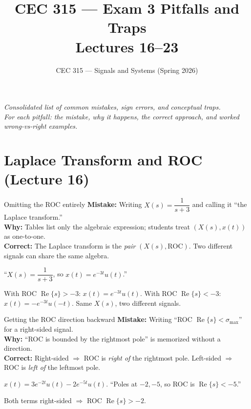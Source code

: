 \documentclass[11pt]{article}
\title{CEC 315 --- Exam 3 Pitfalls and Traps\\\large Lectures 16--23}
\author{CEC 315 --- Signals and Systems (Spring 2026)}
\date{}
\renewcommand{\Re}{\operatorname{Re}}
\begin{document}
\maketitle

\begin{center}
\emph{Consolidated list of common mistakes, sign errors, and conceptual traps.\\
For each pitfall: the mistake, why it happens, the correct approach, and worked wrong-vs-right examples.}
\end{center}

\tableofcontents
\newpage

\section{Laplace Transform and ROC (Lecture 16)}

\begin{pitfallbox}{Omitting the ROC entirely}
\textbf{Mistake:} Writing $X(s) = \dfrac{1}{s+3}$ and calling it ``the Laplace transform.''\\
\textbf{Why:} Tables list only the algebraic expression; students treat $(X(s), x(t))$ as one-to-one.\\
\textbf{Correct:} The Laplace transform is the \emph{pair} $(X(s), \text{ROC})$. Two different signals can share the same algebra.
\begin{wrongbox}
``$X(s) = \dfrac{1}{s+3}$, so $x(t) = e^{-3t} u(t)$.''
\end{wrongbox}
\begin{rightbox}
With ROC $\Re\{s\} > -3$: $x(t) = e^{-3t} u(t)$. With ROC $\Re\{s\} < -3$: $x(t) = -e^{-3t} u(-t)$. Same $X(s)$, two different signals.
\end{rightbox}
\end{pitfallbox}

\begin{pitfallbox}{Getting the ROC direction backward}
\textbf{Mistake:} Writing ``ROC $\Re\{s\} < \sigma_{\max}$'' for a right-sided signal.\\
\textbf{Why:} ``ROC is bounded by the rightmost pole'' is memorized without a direction.\\
\textbf{Correct:} Right-sided $\Rightarrow$ ROC is \emph{right of} the rightmost pole. Left-sided $\Rightarrow$ ROC is \emph{left of} the leftmost pole.
\begin{wrongbox}
$x(t) = 3e^{-2t}u(t) - 2e^{-5t}u(t)$. ``Poles at $-2, -5$, so ROC is $\Re\{s\} < -5$.''
\end{wrongbox}
\begin{rightbox}
Both terms right-sided $\Rightarrow$ ROC $\Re\{s\} > -2$.
\end{rightbox}
\end{pitfallbox}
\end{document}
